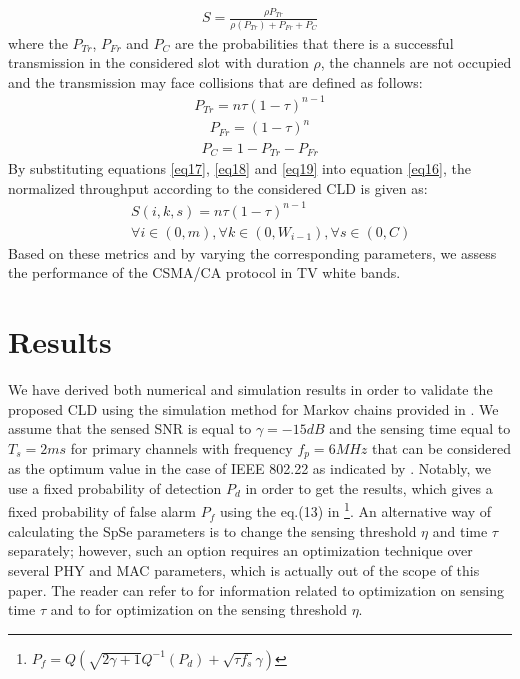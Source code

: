 \documentclass
[journal,11pt,draftclsnofoot,onecolumn,doublespace]{tETN2e}
\begin{document}
\begin{eqnarray} \label{eq16}
 S = \frac{\rho P_{Tr}}{\rho(P_{Tr})+P_{Fr}+P_{C}}
\end{eqnarray}
where the $P_{Tr}$, $P_{Fr}$ and $P_C$ are the probabilities that there is a successful transmission in the considered slot with duration $\rho$, the channels are not occupied and the transmission may face collisions that are defined as follows: 
\begin{eqnarray} \label{eq17}
 P_{Tr} = n \tau (1-\tau)^{n-1}
\end{eqnarray}
\begin{eqnarray} \label{eq18}
 P_{Fr} = (1-\tau)^n
\end{eqnarray}
\begin{eqnarray} \label{eq19}
 P_C = 1-P_{Tr}-P_{Fr}
\end{eqnarray}
By substituting equations \eqref{eq17}, \eqref{eq18} and \eqref{eq19} into equation \eqref{eq16}, the normalized throughput according to the considered CLD is given as: 
\begin{eqnarray} \label{eq20}
 & & S(i,k,s) = n \tau (1-\tau)^{n-1} \nonumber \\ 
& &  \forall i\in (0,m),\forall k\in (0,W_{i-1}),\forall s\in (0,C) 
\end{eqnarray}
Based on these metrics and by varying the corresponding parameters, we assess the performance of the CSMA/CA protocol in TV white bands. 

\section{Results}

We have derived both numerical and simulation results in order to validate the proposed CLD using the simulation method for Markov chains provided in \citep{tranter03}. We assume that the sensed SNR is equal to $\gamma=-15dB$ and the sensing time equal to $T_s=2ms$ for primary channels with frequency $f_p=6MHz$ that can be considered as the optimum value in the case of IEEE 802.22 as indicated by \citep{liang08}. Notably, we use a fixed probability of detection $P_d$ in order to get the results, which gives a fixed probability of false alarm $P_f$ using the eq.(13) in \citep{liang08} \footnote{$P_f=Q(\sqrt{2\gamma +1}Q^{-1}(P_d)+\sqrt{\tau f_s }\gamma)$}. An alternative way of calculating the SpSe parameters is to change the sensing threshold $\eta$ and time $\tau$ separately; however, such an option requires an optimization technique over several PHY and MAC parameters, which is actually out of the scope of this paper. The reader can refer to \citep{liang08} for information related to optimization on sensing time $\tau$ and to \citep{foukalas12} for optimization on the sensing threshold $\eta$.  
\end{document}
